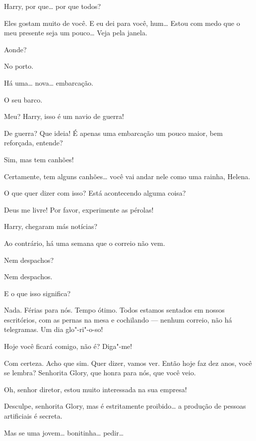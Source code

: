  Harry, por que\ldots{} por que todos?

 Eles gostam muito de você. E eu dei para você, hum\ldots{} Estou com medo que o
meu presente seja um pouco\ldots{} Veja pela janela.

 Aonde?

 No porto.

 Há uma\ldots{} nova\ldots{} embarcação.

 O seu barco.

 Meu? Harry, isso é um navio de guerra!

 De guerra? Que ideia! É apenas uma embarcação um pouco maior, bem reforçada, entende?

 Sim, mas tem canhões!

 Certamente, tem alguns canhões\ldots{} você vai andar nele como uma rainha,
Helena.

 O que quer dizer com isso? Está acontecendo alguma coisa?

 Deus me livre! Por favor, experimente as pérolas! 

 Harry, chegaram más notícias?

 Ao contrário, há uma semana que o correio não vem.

 Nem despachos?

 Nem despachos.

 E o que isso significa?

 Nada. Férias para nós. Tempo ótimo. Todos estamos sentados em nossos
escritórios, com as pernas na mesa e cochilando --- nenhum correio, não há
telegramas.  Um dia glo"-ri"-o-so!

  Hoje você ficará comigo, não é? Diga"-me!

 Com certeza. Acho que sim. Quer dizer, vamos ver.  Então hoje faz dez anos, você se lembra? Senhorita Glory, que honra
para nós, que você veio.

 Oh, senhor diretor, estou muito interessada na sua empresa!

 Desculpe, senhorita Glory, mas é estritamente proibido\ldots{} a produção
de pessoas artificiais é secreta.

 Mas se uma jovem\ldots{} bonitinha\ldots{} pedir\ldots{}

